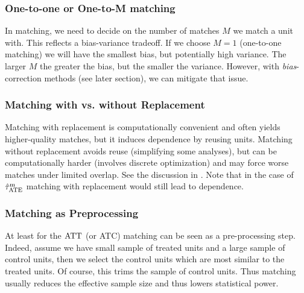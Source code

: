 \documentclass[11pt]{exam}
\begin{document}
\subsubsection{One-to-one or One-to-M matching}
In matching, we need to decide on the number of matches $M$ we match a unit with. This reflects a bias-variance tradeoff. If we choose $M=1$ (one-to-one matching) we will have the smallest bias, but potentially high variance. The larger $M$ the greater the bias, but the smaller the variance. However, with \emph{bias}-correction methods (see later section), we can mitigate that issue.

\subsubsection{Matching with vs. without Replacement}
Matching with replacement is computationally convenient and often yields higher-quality matches, but it induces dependence by reusing units. Matching without replacement avoids reuse (simplifying some analyses), but can be computationally harder (involves discrete optimization) and may force worse matches under limited overlap.
See the discussion in \citet[Chapter 15.2]{ding2023coursecausalinference}. Note that in the case of $\hat \tau^\mathrm{m}_{\mathrm{ATE}}$ matching with replacement would still lead to dependence.

\subsubsection{Matching as Preprocessing}
At least for the $\mathrm{ATT}$ (or ATC) matching can be seen as a pre-processing step. Indeed, assume we have small sample of treated units and a large sample of control units, then we select the control units which are most similar to the treated units. Of course, this trims the sample of control units. Thus matching usually reduces the effective sample size and thus lowers statistical power.
\end{document}
